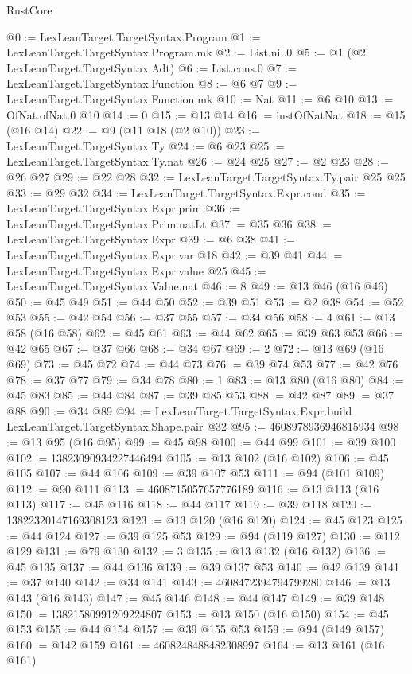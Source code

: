 \begin{lexlean}{RustCore}
\begin{coremodule}
@0 := LexLeanTarget.TargetSyntax.Program
@1 := LexLeanTarget.TargetSyntax.Program.mk
@2 := List.nil.{0}
@5 := @1 (@2 LexLeanTarget.TargetSyntax.Adt)
@6 := List.cons.{0}
@7 := LexLeanTarget.TargetSyntax.Function
@8 := @6 @7
@9 := LexLeanTarget.TargetSyntax.Function.mk
@10 := Nat
@11 := @6 @10
@13 := OfNat.ofNat.{0} @10
@14 := 0
@15 := @13 @14
@16 := instOfNatNat
@18 := @15 (@16 @14)
@22 := @9 (@11 @18 (@2 @10))
@23 := LexLeanTarget.TargetSyntax.Ty
@24 := @6 @23
@25 := LexLeanTarget.TargetSyntax.Ty.nat
@26 := @24 @25
@27 := @2 @23
@28 := @26 @27
@29 := @22 @28
@32 := LexLeanTarget.TargetSyntax.Ty.pair @25 @25
@33 := @29 @32
@34 := LexLeanTarget.TargetSyntax.Expr.cond
@35 := LexLeanTarget.TargetSyntax.Expr.prim
@36 := LexLeanTarget.TargetSyntax.Prim.natLt
@37 := @35 @36
@38 := LexLeanTarget.TargetSyntax.Expr
@39 := @6 @38
@41 := LexLeanTarget.TargetSyntax.Expr.var @18
@42 := @39 @41
@44 := LexLeanTarget.TargetSyntax.Expr.value @25
@45 := LexLeanTarget.TargetSyntax.Value.nat
@46 := 8
@49 := @13 @46 (@16 @46)
@50 := @45 @49
@51 := @44 @50
@52 := @39 @51
@53 := @2 @38
@54 := @52 @53
@55 := @42 @54
@56 := @37 @55
@57 := @34 @56
@58 := 4
@61 := @13 @58 (@16 @58)
@62 := @45 @61
@63 := @44 @62
@65 := @39 @63 @53
@66 := @42 @65
@67 := @37 @66
@68 := @34 @67
@69 := 2
@72 := @13 @69 (@16 @69)
@73 := @45 @72
@74 := @44 @73
@76 := @39 @74 @53
@77 := @42 @76
@78 := @37 @77
@79 := @34 @78
@80 := 1
@83 := @13 @80 (@16 @80)
@84 := @45 @83
@85 := @44 @84
@87 := @39 @85 @53
@88 := @42 @87
@89 := @37 @88
@90 := @34 @89
@94 := LexLeanTarget.TargetSyntax.Expr.build LexLeanTarget.TargetSyntax.Shape.pair @32
@95 := 4608978936946815934
@98 := @13 @95 (@16 @95)
@99 := @45 @98
@100 := @44 @99
@101 := @39 @100
@102 := 13823090934227446494
@105 := @13 @102 (@16 @102)
@106 := @45 @105
@107 := @44 @106
@109 := @39 @107 @53
@111 := @94 (@101 @109)
@112 := @90 @111
@113 := 4608715057657776189
@116 := @13 @113 (@16 @113)
@117 := @45 @116
@118 := @44 @117
@119 := @39 @118
@120 := 13822320147169308123
@123 := @13 @120 (@16 @120)
@124 := @45 @123
@125 := @44 @124
@127 := @39 @125 @53
@129 := @94 (@119 @127)
@130 := @112 @129
@131 := @79 @130
@132 := 3
@135 := @13 @132 (@16 @132)
@136 := @45 @135
@137 := @44 @136
@139 := @39 @137 @53
@140 := @42 @139
@141 := @37 @140
@142 := @34 @141
@143 := 4608472394794799280
@146 := @13 @143 (@16 @143)
@147 := @45 @146
@148 := @44 @147
@149 := @39 @148
@150 := 13821580991209224807
@153 := @13 @150 (@16 @150)
@154 := @45 @153
@155 := @44 @154
@157 := @39 @155 @53
@159 := @94 (@149 @157)
@160 := @142 @159
@161 := 4608248488482308997
@164 := @13 @161 (@16 @161)

\end{coremodule}
\end{lexlean}
